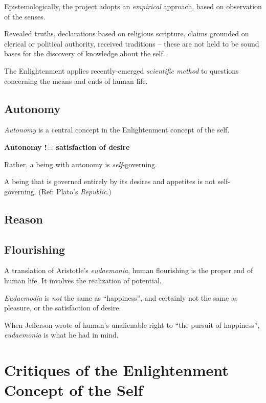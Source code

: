 \documentclass[
]{book}
\begin{document}
Epistemologically, the project adopts an \emph{empirical} approach, based on observation of the senses.

Revealed truths, declarations based on religious scripture, claims grounded on clerical or political authority, received traditions -- these are not held to be sound bases for the discovery of knowledge about the self.

The Enlightenment applies recently-emerged \emph{scientific method} to questions concerning the means and ends of human life.

\hypertarget{autonomy}{%
\section{Autonomy}\label{autonomy}}

\emph{Autonomy} is a central concept in the Enlightenment concept of the self.

\textbf{Autonomy != satisfaction of desire}

Rather, a being with autonomy is \emph{self}-governing.

A being that is governed entirely by its desires and appetites is not self-governing.
(Ref: Plato's \emph{Republic}.)

\hypertarget{reason}{%
\section{Reason}\label{reason}}

\hypertarget{flourishing}{%
\section{Flourishing}\label{flourishing}}

A translation of Aristotle's \emph{eudaemonia}, human flourishing is the proper end of human life. It involves the realization of potential.

\emph{Eudaemodia} is \emph{not} the same as ``happiness'', and certainly not the same as pleasure, or the satisfaction of desire.

When Jefferson wrote of human's unalienable right to ``the pursuit of happiness'', \emph{eudaemonia} is what he had in mind.

\hypertarget{critiques-of-the-enlightenment-concept-of-the-self}{%
\chapter{Critiques of the Enlightenment Concept of the Self}\label{critiques-of-the-enlightenment-concept-of-the-self}}
\end{document}
